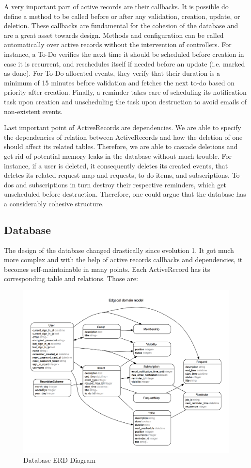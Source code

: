 \documentclass[11pt]{article}
\begin{document}
A very important part of active records are their callbacks. It is possible do define a method to be called before or after any validation, creation, update, or deletion. These callbacks are fundamental for the cohesion of the database and are a great asset towards design. Methods and configuration can be called automatically over active records without the intervention of controllers. For instance, a To-Do verifies the next time it should be scheduled before creation in case it is recurrent, and reschedules itself if needed before an update (i.e. marked as done). For To-Do allocated events, they verify that their duration is a minimum of 15 minutes before validation and fetches the next to-do based on priority after creation. Finally, a reminder takes care of scheduling its notification task upon creation and unscheduling the task upon destruction to avoid emails of non-existent events.

Last important point of ActiveRecords are dependencies. We are able to specify the dependencies of relation between ActiveRecords and how the deletion of one should affect its related tables. Therefore, we are able to cascade deletions and get rid of potential memory leaks in the database without much trouble. For instance, if a user is deleted, it consequently deletes its created events, that deletes its related request map and requests, to-do items, and subscriptions. To-dos and subscriptions in turn destroy their respective reminders, which get unscheduled before destruction. Therefore, one could argue that the database has a considerably cohesive structure.

\subsection{Database}

The design of the database changed drastically since evolution 1. It got much more complex and with the help of active records callbacks and dependencies, it becomes self-maintainable in many points. Each ActiveRecord has its corresponding table and relations. Those are:

\begin{figure}[H]
\centering
\includegraphics[scale=0.6]{erd.png}
\caption{Database ERD Diagram}
\end{figure}
\end{document}
